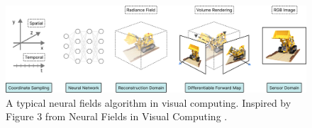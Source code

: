 \begin{figure}[!h]
    \centering
    \includegraphics[width=1.0\textwidth]{figures/neural-field.png}
    \caption[A typical neural fields algorithm in visual computing.]{A typical neural fields algorithm in visual computing. Inspired by Figure 3 from Neural Fields in Visual Computing \cite{xie_neural_2022}.}
    \label{fig:neural-field}
\end{figure}